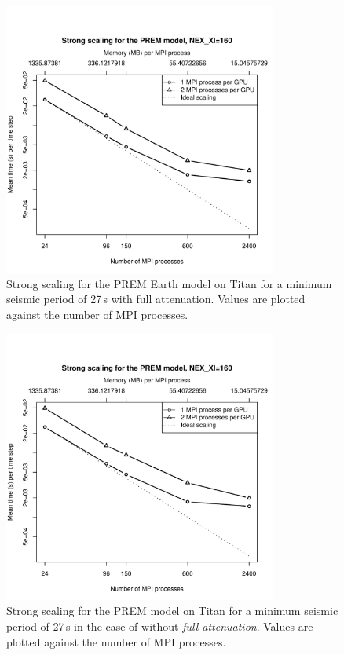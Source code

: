 \begin{figure}
  \centering
  \includegraphics[width=0.8\textwidth]{ch-workflow/figures/s160unq}
  \caption[Strong scaling of SPECFEM3D GLOBE for the PREM Earth model on Titan for 27\,s minimum period with full attenuation]
	{Strong scaling for the PREM Earth model on Titan for a minimum seismic
	period of 27\,s with full attenuation. Values are plotted
	against the number of MPI processes. }
   \label{fig:s160unq}
\end{figure}


\begin{figure}
  \centering
  \includegraphics[width=0.8\textwidth]{ch-workflow/figures/s160nounq}
  \caption[Strong scaling of SPECFEM3D GLOBE for the PREM Earth model on Titan for 27\,s minimum period w/o ffull attenuation]
	{Strong scaling for the PREM model on Titan for a minimum seismic
	period of 27\,s in the case of without \emph{full attenuation}.
  Values are plotted against the number of MPI processes. }
   \label{fig:s160nounq}
\end{figure}


